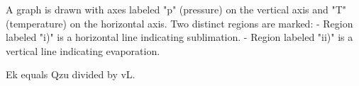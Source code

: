 A graph is drawn with axes labeled "p" (pressure) on the vertical axis and "T" (temperature) on the horizontal axis. Two distinct regions are marked:  
- Region labeled "i)" is a horizontal line indicating sublimation.  
- Region labeled "ii)" is a vertical line indicating evaporation.

Ek equals Qzu divided by vL.